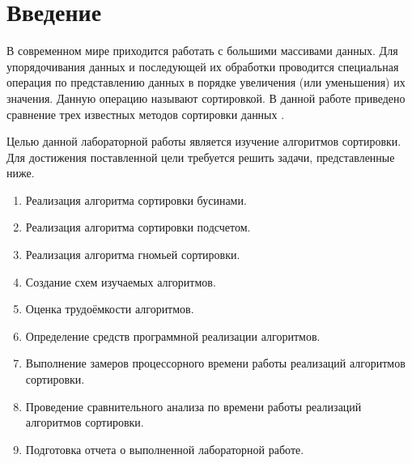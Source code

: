 \chapter*{Введение}

В современном мире приходится работать с большими
массивами данных. Для упорядочивания данных и последующей их
обработки проводится специальная операция по представлению
данных в порядке увеличения (или уменьшения) их значения. Данную
операцию называют сортировкой. В данной работе приведено
сравнение трех известных методов сортировки данных \cite{sort}.

Целью данной лабораторной работы является изучение алгоритмов сортировки. Для достижения поставленной цели требуется решить задачи, представленные ниже.

\begin{enumerate}
	\item Реализация алгоритма сортировки бусинами.
	\item Реализация алгоритма сортировки подсчетом.
	\item Реализация алгоритма гномьей сортировки.
	\item Создание схем изучаемых алгоритмов.
	\item Оценка трудоёмкости алгоритмов.
	\item Определение средств программной реализации алгоритмов.
	\item Выполнение замеров процессорного времени работы реализаций алгоритмов сортировки.
	\item Проведение сравнительного анализа по времени работы реализаций алгоритмов сортировки.
	\item Подготовка отчета о выполненной лабораторной работе.
\end{enumerate}